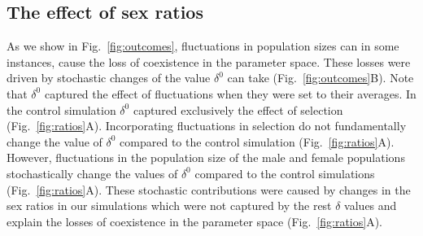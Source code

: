 \subsection*{The effect of sex ratios}

As we show in Fig.~\ref{fig:outcomes}, fluctuations in population sizes can in some instances, cause the loss of coexistence in the parameter space. These losses were driven by stochastic changes of the value $\delta^{0}$ can take (Fig.~\ref{fig:outcomes}B). Note that $\delta^{0}$  captured the effect of fluctuations when they were set to their averages. In the control simulation $\delta^{0}$ captured exclusively the effect of selection (Fig.~\ref{fig:ratios}A). Incorporating fluctuations in selection do not fundamentally change the value of $\delta^{0}$ compared to the control simulation (Fig.~\ref{fig:ratios}A). However, fluctuations in the population size of the male and female populations stochastically change the values of $\delta^{0}$ compared to the control simulations (Fig.~\ref{fig:ratios}A). These stochastic contributions were caused by changes in the sex ratios in our simulations which were not captured by the rest  $\delta$ values and explain the losses of coexistence in the parameter space (Fig.~\ref{fig:ratios}A).

